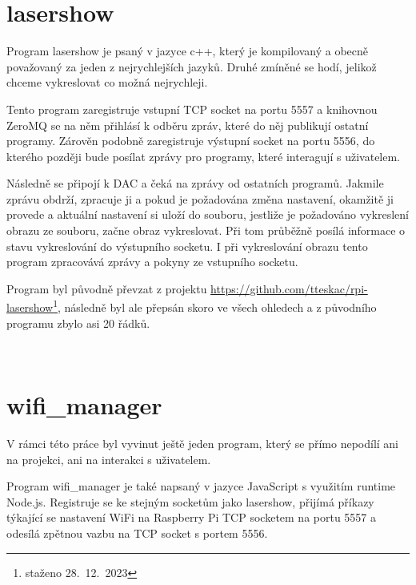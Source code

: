 \section{lasershow}

Program lasershow je psaný v jazyce c++, který je kompilovaný a obecně považovaný za jeden z nejrychlejších jazyků. Druhé zmíněné se hodí, jelikož chceme vykreslovat co možná nejrychleji.

Tento program zaregistruje vstupní TCP socket na portu 5557 a knihovnou ZeroMQ se na něm přihlásí k odběru zpráv, které do něj publikují ostatní programy. Zárověn podobně zaregistruje výstupní socket na portu 5556, do kterého později bude posílat zprávy pro programy, které interagují s uživatelem.

Následně se připojí k DAC a čeká na zprávy od ostatních programů. Jakmile zprávu obdrží, zpracuje ji a pokud je požadována změna nastavení, okamžitě ji provede a aktuální nastavení si uloží do souboru, jestliže je požadováno vykreslení obrazu ze souboru, začne obraz vykreslovat. Při tom průběžně posílá informace o stavu vykreslování do výstupního socketu. I při vykreslování obrazu tento program zpracovává zprávy a pokyny ze vstupního socketu.

Program byl původně převzat z projektu \url{https://github.com/tteskac/rpi-lasershow}\footnote{staženo 28.~12.~2023}, následně byl ale přepsán skoro ve všech ohledech a z původního programu zbylo asi 20 řádků.


\






\section{wifi\_manager}

V rámci této práce byl vyvinut ještě jeden program, který se přímo nepodílí ani na projekci, ani na interakci s uživatelem.

Program wifi\_manager je také napsaný v jazyce JavaScript s využitím runtime Node.js. Registruje se ke stejným socketům jako lasershow, přijímá příkazy týkající se nastavení WiFi na Raspberry Pi TCP socketem na portu 5557 a odesílá zpětnou vazbu na TCP socket s portem 5556.

